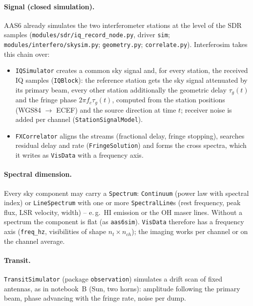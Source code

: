 \paragraph*{Signal (closed simulation).} AAS6 already simulates the two
interferometer stations at the level of the SDR samples
(\texttt{modules/sdr/iq\_record\_node.py}, driver \texttt{sim};
\texttt{modules/interfero/skysim.py}; \texttt{geometry.py};
\texttt{correlate.py}). Interferosim takes this chain over:
\begin{itemize}
  \item \texttt{IQSimulator} creates a common sky signal and, for every
        station, the received IQ samples (\texttt{IQBlock}): the
        reference station gets the sky signal attenuated by its primary
        beam, every other station additionally the geometric delay
        $\tau_g(t)$ and the fringe phase $2\pi f_c\tau_g(t)$, computed
        from the station positions (WGS84 $\rightarrow$ ECEF) and the
        source direction at time $t$; receiver noise is added per
        channel (\texttt{StationSignalModel}).
  \item \texttt{FXCorrelator} aligns the streams (fractional delay,
        fringe stopping), searches residual delay and rate
        (\texttt{FringeSolution}) and forms the cross spectra, which it
        writes as \texttt{VisData} with a frequency axis.
\end{itemize}

\paragraph*{Spectral dimension.} Every sky component may carry a
\texttt{Spectrum}: \texttt{Continuum} (power law with spectral index) or
\texttt{LineSpectrum} with one or more \texttt{SpectralLine}s (rest
frequency, peak flux, LSR velocity, width) -- e.\,g.\ HI emission or the
OH maser lines. Without a spectrum the component is flat (as
\texttt{aas6sim}). \texttt{VisData} therefore has a frequency axis
(\texttt{freq\_hz}, visibilities of shape $n_t\times n_{ch}$); the imaging
works per channel or on the channel average.

\paragraph*{Transit.} \texttt{TransitSimulator} (package
\texttt{observation}) simulates a drift scan of fixed antennas, as in
notebook~B (Sun, two horns): amplitude following the primary beam,
phase advancing with the fringe rate, noise per dump.


